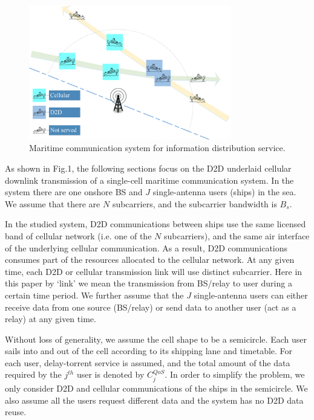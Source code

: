 \documentclass{ieeeaccess}
\begin{document}
\begin{figure} [htb]
\includegraphics*[width=8.8cm]{SysModel.eps}
\caption{Maritime communication system for information distribution service.}\label{fig:1}
\end{figure}



As shown in Fig.1, the following sections focus on the D2D underlaid cellular downlink transmission of a single-cell maritime communication system. In the system there are one onshore BS
and  $J$ single-antenna users (ships) in the sea. We assume that there are $N$ subcarriers, and the subcarrier bandwidth is ${B_s}$. 

In the studied system, D2D communications between ships use the same licensed band of cellular network (i.e. one of the $N$ subcarriers), and the same air interface of the underlying cellular communication. As a result, D2D communications consumes part of the resources allocated to the cellular network.
At any given time, each D2D or cellular transmission link will use distinct subcarrier. Here in this paper by `link' we mean the transmission from BS/relay to user during a certain time period. We further assume that the $J$ single-antenna users can either receive data from one source (BS/relay) or send data to another user (act as a relay) at any given time.

Without loss of generality, we assume the cell shape to be a semicircle. 
Each user sails into and out of the cell according to its shipping lane and timetable. For each user, delay-torrent service is assumed, and the total amount of the data required by the ${j^{th}}$ user is denoted by $C_j^{QoS}$. In order to simplify the problem, we only consider D2D and cellular communications of the ships in the semicircle. We also assume all the users request different data and the system has no D2D data reuse.
\end{document}
